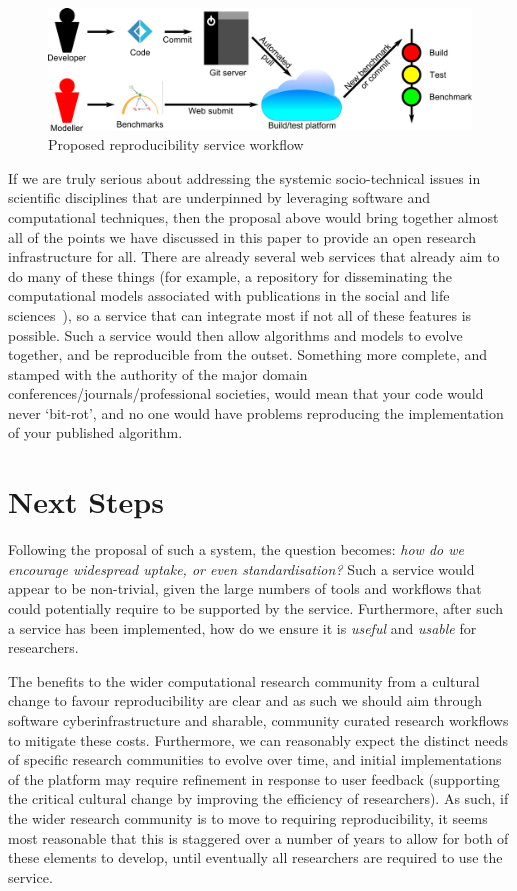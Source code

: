 \documentclass[a4paper,11pt]{article}
\begin{document}
\begin{figure}[!ht]
\centering
\includegraphics[width=0.9\columnwidth]{images/workflow.png}
\caption{Proposed reproducibility service workflow}
\label{fig:workflow} 
\end{figure}

If we are truly serious about addressing the systemic socio-technical
issues in scientific disciplines that are underpinned by leveraging
software and computational techniques, then the proposal above would
bring together almost all of the points we have discussed in this
paper to provide an open research infrastructure for all. There are
already several web services that already aim to do many of these
things (for example, a repository for disseminating the computational
models associated with publications in the social and life
sciences~\cite{rollins-et-al:2014}), so a service that can integrate
most if not all of these features is possible. Such a service would
then allow algorithms and models to evolve together, and be
reproducible from the outset. Something more complete, and stamped
with the authority of the major domain
conferences/journals/professional societies, would mean that your code
would never `bit-rot', and no one would have problems reproducing the
implementation of your published algorithm.


\section{Next Steps}

Following the proposal of such a system, the question becomes:
{\emph{how do we encourage widespread uptake, or even
standardisation?}}  Such a service would appear to be non-trivial,
given the large numbers of tools and workflows that could potentially
require to be supported by the service. Furthermore, after such a
service has been implemented, how do we ensure it is \emph{useful} and
\emph{usable} for researchers.

The benefits to the wider computational research community from a
cultural change to favour reproducibility are clear and as such we
should aim through software cyberinfrastructure and sharable,
community curated research workflows to mitigate these
costs. Furthermore, we can reasonably expect the distinct needs of
specific research communities to evolve over time, and initial
implementations of the platform may require refinement in response to
user feedback (supporting the critical cultural change by improving
the efficiency of researchers). As such, if the wider research
community is to move to requiring reproducibility, it seems most
reasonable that this is staggered over a number of years to allow for
both of these elements to develop, until eventually all researchers
are required to use the service.
\end{document}
